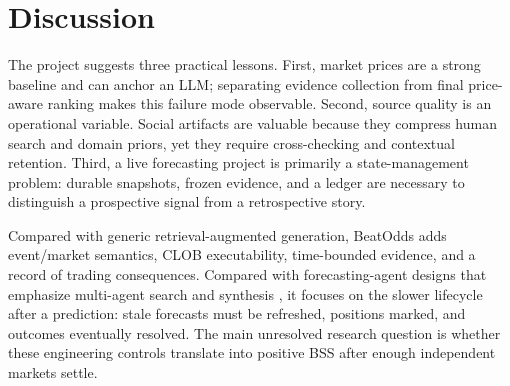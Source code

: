 \section{Discussion}

The project suggests three practical lessons. First, market prices are a strong baseline and can anchor an LLM; separating evidence collection from final price-aware ranking makes this failure mode observable. Second, source quality is an operational variable. Social artifacts are valuable because they compress human search and domain priors, yet they require cross-checking and contextual retention. Third, a live forecasting project is primarily a state-management problem: durable snapshots, frozen evidence, and a ledger are necessary to distinguish a prospective signal from a retrospective story.

Compared with generic retrieval-augmented generation, BeatOdds adds event/market semantics, CLOB executability, time-bounded evidence, and a record of trading consequences. Compared with forecasting-agent designs that emphasize multi-agent search and synthesis \citep{aiaforecaster2025}, it focuses on the slower lifecycle after a prediction: stale forecasts must be refreshed, positions marked, and outcomes eventually resolved. The main unresolved research question is whether these engineering controls translate into positive BSS after enough independent markets settle.
